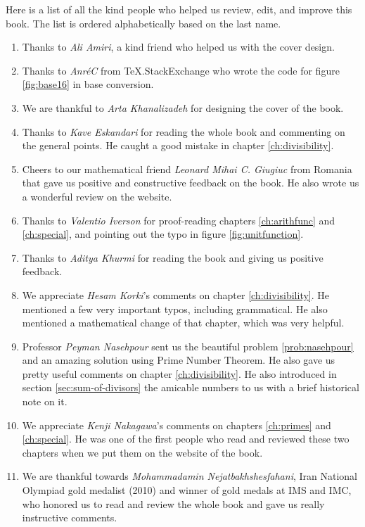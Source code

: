 \documentclass[leqno,14pt,DIV=calc,toc=index]{scrbook}
\begin{document}
Here is a list of all the kind people who helped us review, edit, and improve this book. The list is ordered alphabetically based on the last name.
	\begin{enumerate}
		\item Thanks to \textit{Ali Amiri}, a kind friend who helped us with the cover design.
		\item Thanks to \textit{Anr\'{e}C} from TeX.StackExchange who wrote the code for figure \eqref{fig:base16} in base conversion.
		\item We are thankful to \textit{Arta Khanalizadeh} for designing the cover of the book.
		\item Thanks to \textit{Kave Eskandari} for reading the whole book and commenting on the general points. He caught a good mistake in chapter \ref{ch:divisibility}.
		\item Cheers to our mathematical friend \textit{Leonard Mihai C. Giugiuc} from Romania that gave us positive and constructive feedback on the book. He also wrote us a wonderful review on the website.

		\item Thanks to \textit{Valentio Iverson} for proof-reading chapters \ref{ch:arithfunc} and \ref{ch:special}, and pointing out the typo in figure \eqref{fig:unitfunction}.

		\item Thanks to \textit{Aditya Khurmi} for reading the book and giving us positive feedback.

		\item We appreciate \textit{Hesam Korki}'s comments on chapter \ref{ch:divisibility}. He mentioned a few very important typos, including grammatical. He also mentioned a mathematical change of that chapter, which was very helpful.

		\item Professor \textit{Peyman Nasehpour} sent us the beautiful problem \eqref{prob:nasehpour} and an amazing solution using Prime Number Theorem. He also gave us pretty useful comments on chapter \ref{ch:divisibility}. He also introduced in section \eqref{sec:sum-of-divisors} the amicable numbers to us with a brief historical note on it.

		\item We appreciate \textit{Kenji Nakagawa}'s comments on chapters \ref{ch:primes} and \ref{ch:special}. He was one of the first people who read and reviewed these two chapters when we put them on the website of the book.

		\item We are thankful towards \textit{Mohammadamin Nejatbakhshesfahani}, Iran National Olympiad gold medalist (2010) and winner of gold medals at IMS and IMC, who honored us to read and review the whole book and gave us really instructive comments.


\end{enumerate}
\end{document}
